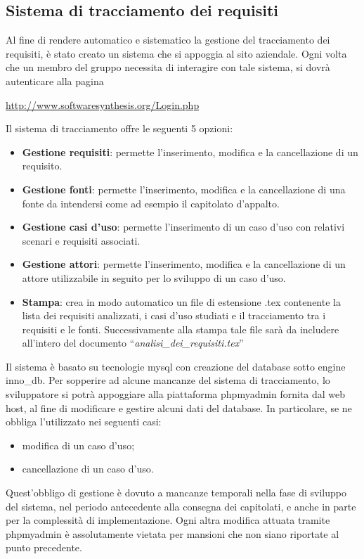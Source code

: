 \subsection{Sistema di tracciamento dei requisiti}
\label{sec:tracciamento}
Al fine di rendere automatico e sistematico la gestione del tracciamento dei requisiti, è stato creato un sistema che si appoggia al sito aziendale. Ogni volta che un membro del gruppo necessita di interagire con tale sistema, si dovrà autenticare alla pagina
\newline
\begin{center}
\url{http://www.softwaresynthesis.org/Login.php}
\end{center}
Il sistema di tracciamento offre le seguenti 5 opzioni:
\begin{itemize}
\item \textbf{Gestione requisiti}: permette l'inserimento, modifica e la cancellazione di un requisito.
\item \textbf{Gestione fonti}: permette l'inserimento, modifica e la cancellazione di una fonte da intendersi come ad esempio il capitolato d'appalto.
\item \textbf{Gestione casi d'uso}: permette l'inserimento di un caso d'uso con relativi scenari  e requisiti associati.
\item \textbf{Gestione attori}: permette l'inserimento, modifica e la cancellazione di un attore utilizzabile in seguito per lo sviluppo di un caso d'uso.
\item \textbf{Stampa}: crea in modo automatico un file di estensione .tex contenente la lista dei requisiti analizzati, i casi d'uso studiati e il tracciamento tra i requisiti e le fonti. Successivamente alla stampa tale file sarà da includere all'intero del documento ``\textit{analisi\_dei\_requisiti.tex}''
\end{itemize}
Il sistema è basato su tecnologie mysql con creazione del database sotto engine inno\_db. Per sopperire ad alcune mancanze del sistema di tracciamento, lo sviluppatore si potrà appoggiare alla piattaforma phpmyadmin fornita dal web host, al fine di modificare e gestire alcuni dati del database. In particolare, se ne obbliga l'utilizzato nei seguenti casi:
\begin{itemize}
\item modifica di un caso d'uso;
\item cancellazione di un caso d'uso.
\end{itemize}
Quest'obbligo di gestione è dovuto a mancanze temporali nella fase di sviluppo del sistema, nel periodo antecedente alla consegna dei capitolati, e anche in parte per la complessità di implementazione.
\newline
Ogni altra modifica attuata tramite phpmyadmin è assolutamente vietata per mansioni che non siano riportate al punto precedente.


